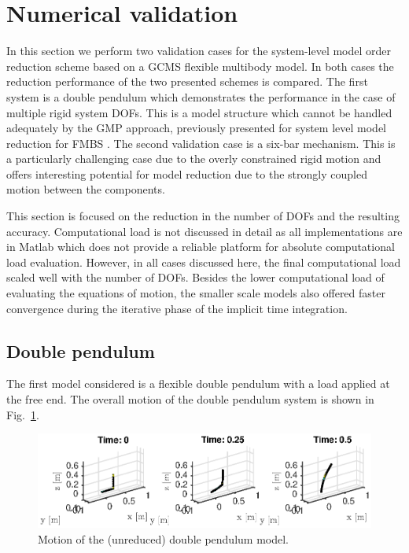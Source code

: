 \section{{Numerical validation}}
\label{sec-numerical_example}


In this section we perform two validation cases for the system-level model order reduction scheme based on a GCMS flexible multibody model. In both cases the reduction performance of the two presented schemes is compared. The first system is a double pendulum which demonstrates the performance in the case of multiple rigid system DOFs. This is a model structure which cannot be handled adequately by the GMP approach, previously presented for system level model reduction for FMBS \cite{Bruls2008}. The second validation case is a six-bar mechanism. This is a particularly challenging case due to the overly constrained rigid motion and offers interesting potential for model reduction due to the strongly coupled motion between the components. 

This section is focused on the reduction in the number of DOFs and the resulting accuracy. Computational load is not discussed in detail as all implementations are in Matlab \cite{Matlab} which does not provide a reliable platform for absolute computational load evaluation. However, in all cases discussed here, the final computational load scaled well with the number of DOFs. Besides the lower computational load of evaluating the equations of motion, the smaller scale models also offered faster convergence during the iterative phase of the implicit time integration. 

\subsection{Double pendulum}
The first model considered is a flexible double pendulum with a load applied at the free end. The overall motion of the double pendulum system is shown in Fig.~\ref{fig:DoublePendulum}. 
\begin{figure}[htp]
\centering
\includegraphics[bb= 1cm 1cm 14cm 4cm, clip, scale=1]{DoublePendulum.eps} 
\caption{Motion of the (unreduced) double pendulum model.}
\label{fig:DoublePendulum}
\end{figure}

